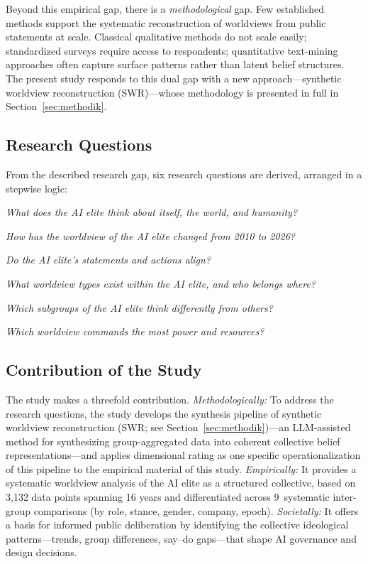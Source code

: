 \documentclass[12pt,a4paper]{article}
\begin{document}
Beyond this empirical gap, there is a \emph{methodological} gap. Few established methods support the systematic reconstruction of worldviews from public statements at scale. Classical qualitative methods do not scale easily; standardized surveys require access to respondents; quantitative text-mining approaches often capture surface patterns rather than latent belief structures. The present study responds to this dual gap with a new approach---synthetic worldview reconstruction (SWR)---whose methodology is presented in full in Section~\ref{sec:methodik}.


\subsection{Research Questions}
\label{sec:einleitung:fragen}

From the described research gap, six research questions are derived, arranged in a stepwise logic:

\begin{description}[style=nextline, leftmargin=1.5cm]
  \item[RQ1: WORLDVIEW (descriptive)] \emph{What does the AI elite think about itself, the world, and humanity?}
  \item[RQ2: CHANGE (longitudinal)] \emph{How has the worldview of the AI elite changed from 2010 to 2026?}
  \item[RQ3: CONGRUENCE (validating)] \emph{Do the AI elite's statements and actions align?}
  \item[RQ4: CLUSTERS (exploratory)] \emph{What worldview types exist within the AI elite, and who belongs where?}
  \item[RQ5: DIFFERENCE (comparative)] \emph{Which subgroups of the AI elite think differently from others?}
  \item[RQ6: POWER (normative)] \emph{Which worldview commands the most power and resources?}
\end{description}


\subsection{Contribution of the Study}
\label{sec:einleitung:beitrag}

The study makes a threefold contribution. \emph{Methodologically:} To address the research questions, the study develops the synthesis pipeline of synthetic worldview reconstruction (SWR; see Section~\ref{sec:methodik})---an LLM-assisted method for synthesizing group-aggregated data into coherent collective belief representations---and applies dimensional rating as one specific operationalization of this pipeline to the empirical material of this study. \emph{Empirically:} It provides a systematic worldview analysis of the AI elite as a structured collective, based on 3,132 data points spanning 16 years and differentiated across 9~systematic inter-group comparisons (by role, stance, gender, company, epoch). \emph{Societally:} It offers a basis for informed public deliberation by identifying the collective ideological patterns---trends, group differences, say--do gaps---that shape AI governance and design decisions.
\end{document}
